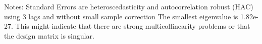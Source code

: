 Notes: \newline
 [1] Standard Errors are heteroscedasticity and autocorrelation robust (HAC) using 3 lags and without small sample correction \newline
 [2] The smallest eigenvalue is 1.82e-27. This might indicate that there are \newline
 strong multicollinearity problems or that the design matrix is singular.